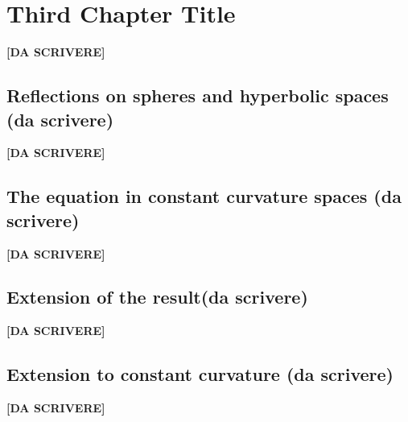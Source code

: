 \chapter{Third Chapter Title}
{\vspace{10pt}\LARGE \bf [DA SCRIVERE]}
\section{Reflections on spheres and hyperbolic spaces (da scrivere)}	
{\vspace{10pt}\LARGE \bf [DA SCRIVERE]}

\clearpage
\section{The equation in constant curvature spaces (da scrivere)}	
{\vspace{10pt}\LARGE \bf [DA SCRIVERE]}

\clearpage
\section{Extension of the result(da scrivere)}	
{\vspace{10pt}\LARGE \bf [DA SCRIVERE]}

\clearpage
\section{Extension to constant curvature (da scrivere)}	
{\vspace{10pt}\LARGE \bf [DA SCRIVERE]}
